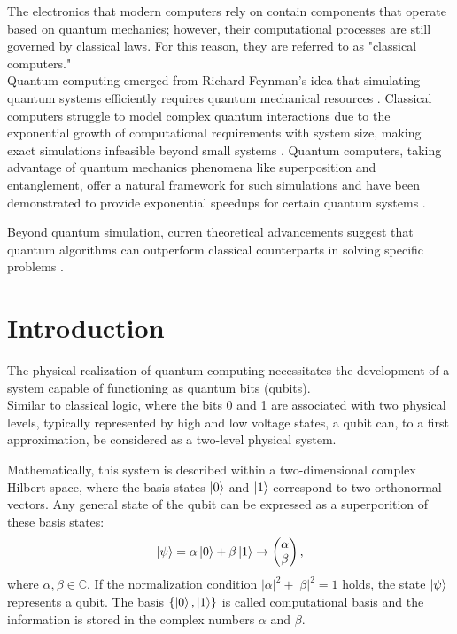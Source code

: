 The electronics that modern computers rely on contain components that operate based on quantum mechanics; however, their computational processes are still governed by classical laws. 
For this reason, they are referred to as "classical computers."\\

Quantum computing emerged from Richard Feynman’s idea that simulating quantum systems efficiently requires quantum mechanical resources \cite{Feynman1982}. 
Classical computers struggle to model complex quantum interactions due to the exponential growth of computational requirements with system size, making exact simulations infeasible beyond small systems \cite{Brown2010}. 
Quantum computers, taking advantage of quantum mechanics phenomena like superposition and entanglement, offer a natural framework for such simulations and have been demonstrated to provide exponential speedups for certain quantum systems \cite{Georgescu_2014}.

Beyond quantum simulation, curren theoretical advancements suggest that quantum algorithms can outperform classical counterparts in solving specific problems \cite{Montanaro2016}.

\section{Introduction}
The physical realization of quantum computing necessitates the development of a system capable of functioning as quantum bits (qubits).\\
Similar to classical logic, where the bits 0 and 1 are associated with two physical levels, typically represented by high and low voltage states, a qubit can, to a first approximation, be considered as a two-level physical system.

Mathematically, this system is described within a two-dimensional complex Hilbert space, where the basis states $\ket{0}$ and $\ket{1}$ correspond to two orthonormal vectors.
Any general state of the qubit can be expressed as a superporition of these basis states:
\begin{equation}\label{eq:qubit}
    \ket{\psi} = \alpha\ket{0} + \beta\ket{1} \rightarrow \begin{pmatrix} 
        \alpha \\ 
        \beta 
        \end{pmatrix},
\end{equation}
where $\alpha,\beta\in \mathbb{C}$. If the normalization condition $|\alpha|^2 +|\beta|^2 =1$ holds, the state $\ket{\psi}$ represents a qubit.
The basis $\{\ket{0},\ket{1}\}$ is called computational basis and the information is stored in the complex numbers $\alpha$ and $\beta$.

